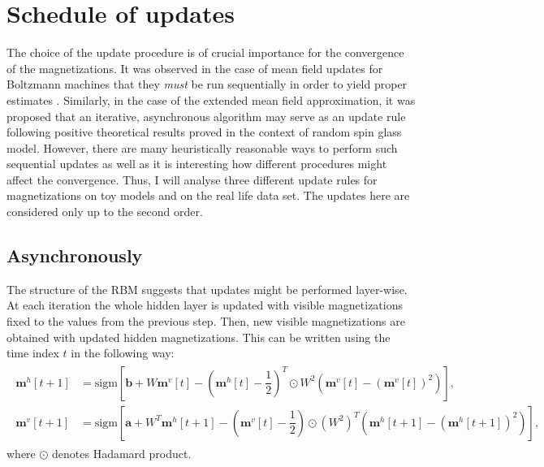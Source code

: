 \section{Schedule of updates}
The choice of the update procedure is of crucial importance for the convergence of the magnetizations. It was observed in the case of mean field updates for Boltzmann machines that they \emph{must} be run sequentially in order to yield proper estimates \cite{welling2002new}. Similarly, in the case of the extended mean field approximation, it was proposed that an iterative, asynchronous algorithm may serve as an update rule \cite{gabrie2015training} following positive theoretical results proved in the context of random spin glass model. However, there are many heuristically reasonable ways to perform such sequential updates as well as it is interesting how different procedures might affect the convergence. Thus, I will analyse three different update rules for magnetizations on toy models and on the real life data set. The updates here are considered only up to the second order.

\subsection{Asynchronously}
The structure of the RBM suggests that updates might be performed layer-wise. At each iteration the whole hidden layer is updated with visible magnetizations fixed to the values from the previous step. Then, new visible magnetizations are obtained with updated hidden magnetizations. This can be written using the time index $t$ in the following way: 
\begin{align}
\begin{split}
\mathbf{m}^h [t+1] & = \text{sigm} \left[  \mathbf{b} + W \mathbf{m}^v[t] - \left( \mathbf{m}^h[t] - \dfrac{1}{2}\right)^T \odot W^2 \left( \mathbf{m}^v[t] - ( \mathbf{m}^v[t])^2 \right) \right], \\
\mathbf{m}^v[t+1] & = \text{sigm} \left[  \mathbf{a} + W^T \mathbf{m}^h[t + 1] -\left( \mathbf{m}^v[t] - \dfrac{1}{2}\right) \odot (W^2)^T  \left(\mathbf{m}^h[t+1] - (\mathbf{m}^h[t+1])^2 \right) \right],
\label{eq:asynch}
\end{split}
\end{align}
where $\odot$ denotes Hadamard product. 

